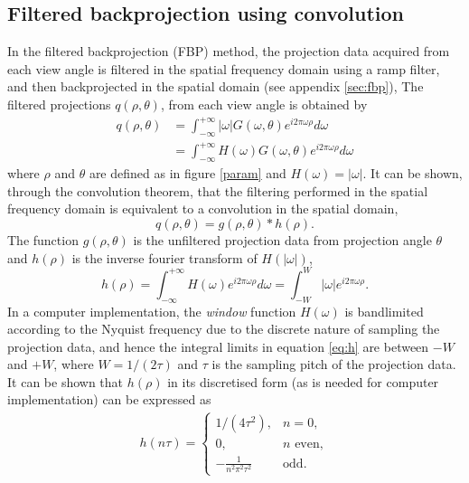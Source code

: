 \documentclass[11pt,a4paper]{article}
\begin{document}
\subsection{Filtered backprojection using convolution}
\label{sec:fbpConv}
In the filtered backprojection (FBP) method, the projection data acquired from each view angle is filtered in the spatial frequency domain using a ramp filter, and then backprojected in the spatial domain (see appendix \ref{sec:fbp}),
The filtered projections $q(\rho, \theta)$, from each view angle is obtained by
\begin{align}
q(\rho,\theta) & = \int_{-\infty}^{+\infty} |\omega|G(\omega,\theta) e^{i2\pi \omega \rho} d\omega
\label{eq:fbpfiltering} \\
& = \int_{-\infty}^{+\infty} H(\omega) G(\omega, \theta) e^{i2\pi \omega \rho} d\omega
\end{align}
where $\rho$ and $\theta$ are defined as in figure \ref{param} and $H(\omega) = |\omega|$. It can be shown, through the convolution theorem, that the filtering performed in the spatial frequency domain is equivalent to a convolution in the spatial domain,
\begin{equation}
q(\rho, \theta) = g(\rho, \theta) * h(\rho). 
\end{equation}
The function $g(\rho, \theta)$ is the unfiltered projection data from projection angle $\theta$ and $h(\rho)$ is the inverse fourier transform of $H(|\omega|)$,
\begin{equation}
h(\rho) = \int_{-\infty}^{+\infty} H(\omega) e^{i2\pi\omega\rho}d\omega = \int_{-W}^{W} |\omega|e^{i2\pi\omega\rho}.
\label{eq:h}
\end{equation}
In a computer implementation, the \textit{window} function $H(\omega)$ is bandlimited according to the Nyquist frequency due to the discrete nature of sampling the projection data, and hence the integral limits in equation \ref{eq:h} are between $-W$ and $+W$, where $W = 1/(2\tau)$ and $\tau$ is the sampling pitch of the projection data. It can be shown that $h(\rho)$ in its discretised form (as is needed for computer implementation) can be expressed as 
\begin{align}
h(n\tau) = \begin{cases}
1/(4\tau^2), & n=0,\\
0, & n \text{ even},\\
-\frac{1}{n^2 \pi^2 \tau^2}  & \text{odd}.
\end{cases}
\end{align}
\end{document}
